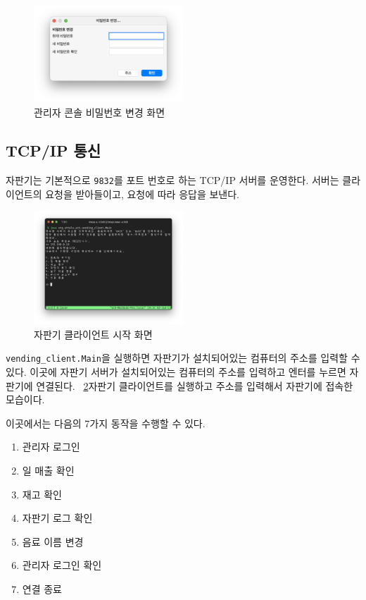 \documentclass{oblivoir}
\newcommand{\figref}[1]{\figurename~\ref{#1}}
\begin{document}
    \begin{figure}[h]
        \centering
        \includegraphics[width=0.5\textwidth]{images/snapshot/password-change}
        \caption{관리자 콘솔 비밀번호 변경 화면}
        \label{fig:password-change}
    \end{figure}

    \subsection{TCP/IP 통신}

    자판기는 기본적으로 \texttt{9832}를 포트 번호로 하는 TCP/IP 서버를 운영한다.
    서버는 클라이언트의 요청을 받아들이고, 요청에 따라 응답을 보낸다.

    \begin{figure}[h]
        \centering
        \includegraphics[width=0.5\textwidth]{images/snapshot/client-start}
        \caption{자판기 클라이언트 시작 화면}
        \label{fig:client-start}
    \end{figure}

    \texttt{vending\_client.Main}을 실행하면 자판기가 설치되어있는 컴퓨터의 주소를 입력할 수 있다.
    이곳에 자판기 서버가 설치되어있는 컴퓨터의 주소를 입력하고 엔터를 누르면 자판기에 연결된다.
    \figref{fig:client-start}\는 자판기 클라이언트를 실행하고 주소를 입력해서 자판기에 접속한 모습이다.

    이곳에서는 다음의 7가지 동작을 수행할 수 있다.

    \begin{enumerate}
        \item 관리자 로그인
        \item 일 매출 확인
        \item 재고 확인
        \item 자판기 로그 확인
        \item 음료 이름 변경
        \setcounter{enumi}{7}
        \item 관리자 로그인 확인
        \item 연결 종료
    \end{enumerate}
\end{document}
